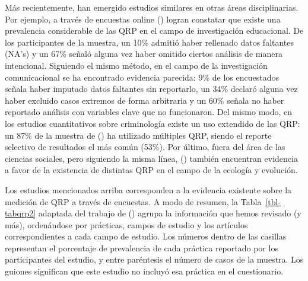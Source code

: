 \documentclass[
  spanish,
  a4paper,
  oneside]{scrbook}
\begin{document}
Más recientemente, han emergido estudios similares en otras áreas
disciplinarias. Por ejemplo, a través de encuestas online
() logran constatar que
existe una prevalencia considerable de las QRP en el campo de
investigación educacional. De los participantes de la muestra, un 10\%
admitió haber rellenado datos faltantes (NA's) y un 67\% señaló alguna
vez haber omitido ciertos análisis de manera intencional. Siguiendo el
mismo método, en el campo de la investigación comunicacional se ha
encontrado evidencia parecida: 9\% de los encuestados señala haber
imputado datos faltantes sin reportarlo, un 34\% declaró alguna vez
haber excluido casos extremos de forma arbitraria y un 60\% señala no
haber reportado análisis con variables clave que no funcionaron. Del
mismo modo, en los estudios cuantitativos sobre criminología existe un
uso extendido de las QRP: un 87\% de la muestra de
() ha utilizado
múltiples QRP, siendo el reporte selectivo de resultados el más común
(53\%). Por último, fuera del área de las ciencias sociales, pero
siguiendo la misma línea,
() también
encuentran evidencia a favor de la existencia de distintas QRP en el
campo de la ecología y evolución.

Los estudios mencionados arriba corresponden a la evidencia existente
sobre la medición de QRP a través de encuestas. A modo de resumen, la
Tabla~\ref{tbl-tabqrp2} adaptada del trabajo de
() agrupa la
información que hemos revisado (y más), ordenándose por prácticas,
campos de estudio y los artículos correspondientes a cada campo de
estudio. Los números dentro de las casillas representan el porcentaje de
prevalencia de cada práctica reportado por los participantes del
estudio, y entre paréntesis el número de casos de la muestra. Los
guiones significan que este estudio no incluyó esa práctica en el
cuestionario.
\end{document}

